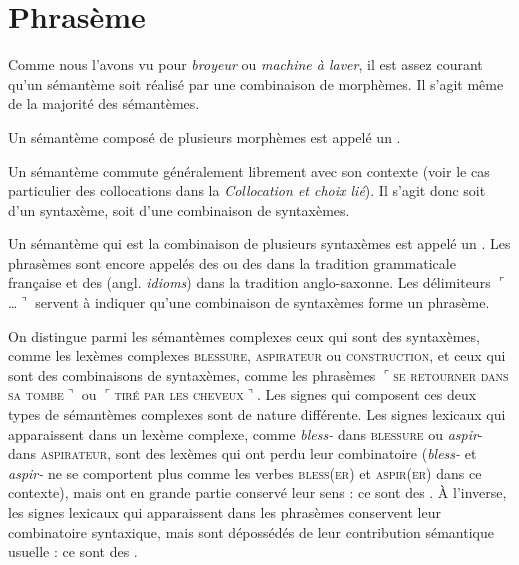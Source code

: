 \section{Phrasème}\label{sec:2.3.7}

Comme nous l’avons vu pour \textit{broyeur} ou \textit{machine à laver}, il est assez courant qu’un sémantème soit réalisé par une combinaison de morphèmes. Il s’agit même de la majorité des sémantèmes.

{Un sémantème composé de plusieurs morphèmes est appelé un .}

Un sémantème commute généralement librement avec son contexte (voir le cas particulier des collocations dans la  \textit{Collocation et choix lié}). Il s’agit donc soit d’un syntaxème, soit d’une combinaison de syntaxèmes.

{Un sémantème qui est la combinaison de plusieurs syntaxèmes est appelé un . Les phrasèmes sont encore appelés des  ou des  dans la tradition grammaticale française et des  (angl. \textit{idioms}) dans la tradition anglo-saxonne. Les délimiteurs $⌜$…$⌝$ servent à indiquer qu’une combinaison de syntaxèmes forme un phrasème.}


On distingue parmi les sémantèmes complexes ceux qui sont des syntaxèmes, comme les lexèmes complexes \textsc{blessure,} \textsc{aspirateur} ou \textsc{construction,} et ceux qui sont des combinaisons de syntaxèmes, comme les phrasèmes $⌜$\textsc{se} \textsc{retourner} \textsc{dans} \textsc{sa} \textsc{tombe}$⌝$ ou $⌜$\textsc{tiré} \textsc{par} \textsc{les} \textsc{cheveux}$⌝$. Les signes qui composent ces deux types de sémantèmes complexes sont de nature différente. Les signes lexicaux qui apparaissent dans un lexème complexe, comme \textit{bless-} dans \textsc{blessure} ou \textit{aspir}{}- dans \textsc{aspirateur}, sont des lexèmes qui ont perdu leur combinatoire (\textit{bless-} et \textit{aspir-} ne se comportent plus comme les verbes \textsc{bless}(\textsc{er}) et \textsc{aspir}(\textsc{er}) dans ce contexte), mais ont en grande partie conservé leur sens : ce sont des . À l’inverse, les signes lexicaux qui apparaissent dans les phrasèmes conservent leur combinatoire syntaxique, mais sont dépossédés de leur contribution sémantique usuelle : ce sont des .

